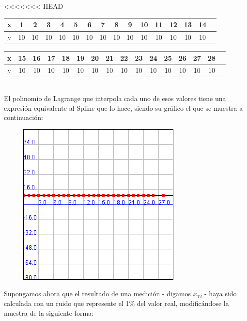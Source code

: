 \documentclass[a4paper]{article}
\begin{document}
<<<<<<< HEAD

\begin{tabular}{ | c || c | c | c | c | c |c | c | c | c | c | c | c | c | c | c |}
 \hline                 
   x & 1 & 2 & 3 & 4 & 5 & 6 & 7 & 8 & 9 & 10 & 11 & 12 & 13 & 14 \\
 \hline    
y & 10 & 10 & 10& 10& 10& 10& 10& 10& 10& 10& 10& 10& 10& 10 \\
 \hline  
 \end{tabular}

\smallskip

\begin{tabular}{  | c || c | c | c | c | c |c | c | c | c | c | c | c | c | c | c |}
 \hline                 
   x&15& 16 & 17 & 18 & 19 & 20 & 21 & 22 & 23 & 24 & 25 & 26 & 27 & 28\\
 \hline    
y & 10 & 10 & 10& 10& 10& 10& 10& 10& 10& 10& 10& 10& 10& 10 \\
 \hline  
 \end{tabular}
\bigskip
\\
El polinomio de Lagrange que interpola cada uno de esos valores tiene una expresión equivalente al Spline que lo hace, siendo su gráfico el que se muestra a continuación:
\smallskip

\begin{figure}[h!]
	\caption{}
	\begin{center}
	\includegraphics[scale=1]{imagenes/LagrangeSplinesCTE}
	\label{LagrangeSplinesCTE}
  \end{center}
\end{figure}

Supongamos ahora que el resultado de una medición - digamos $x_{12}$ - haya sido calculada con un ruido que represente el 1\% del valor real, modificándose la muestra de la siguiente forma:\\
\end{document}
